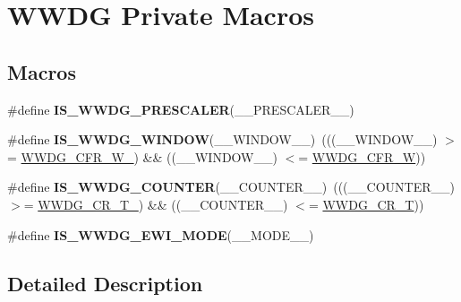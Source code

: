 \hypertarget{group___w_w_d_g___private___macros}{}\section{W\+W\+DG Private Macros}
\label{group___w_w_d_g___private___macros}
\subsection*{Macros}
\begin{DoxyCompactItemize}
\item 
\#define {\bfseries I\+S\+\_\+\+W\+W\+D\+G\+\_\+\+P\+R\+E\+S\+C\+A\+L\+ER}(\+\_\+\+\_\+\+P\+R\+E\+S\+C\+A\+L\+E\+R\+\_\+\+\_\+)
\item 
\mbox{\label{group___w_w_d_g___private___macros_ga2e7358bcfcc6df115466ebfd0ff55644}} 
\#define {\bfseries I\+S\+\_\+\+W\+W\+D\+G\+\_\+\+W\+I\+N\+D\+OW}(\+\_\+\+\_\+\+W\+I\+N\+D\+O\+W\+\_\+\+\_\+)~(((\+\_\+\+\_\+\+W\+I\+N\+D\+O\+W\+\_\+\+\_\+) $>$= \hyperlink{group___peripheral___registers___bits___definition_ga9fc25f8d5c23a76d364c1cb5d7518a17}{W\+W\+D\+G\+\_\+\+C\+F\+R\+\_\+\+W\+\_}) \&\& ((\+\_\+\+\_\+\+W\+I\+N\+D\+O\+W\+\_\+\+\_\+) $<$= \hyperlink{group___peripheral___registers___bits___definition_gabfbb9991bd6a3699399ca569c71fe8c9}{W\+W\+D\+G\+\_\+\+C\+F\+R\+\_\+W}))
\item 
\mbox{\label{group___w_w_d_g___private___macros_ga01304524b12741cc7c4fa1905f1945bd}} 
\#define {\bfseries I\+S\+\_\+\+W\+W\+D\+G\+\_\+\+C\+O\+U\+N\+T\+ER}(\+\_\+\+\_\+\+C\+O\+U\+N\+T\+E\+R\+\_\+\+\_\+)~(((\+\_\+\+\_\+\+C\+O\+U\+N\+T\+E\+R\+\_\+\+\_\+) $>$= \hyperlink{group___peripheral___registers___bits___definition_ga8abc0d44e390aabc2c7f787f2ed0b632}{W\+W\+D\+G\+\_\+\+C\+R\+\_\+\+T\+\_}) \&\& ((\+\_\+\+\_\+\+C\+O\+U\+N\+T\+E\+R\+\_\+\+\_\+) $<$= \hyperlink{group___peripheral___registers___bits___definition_ga400774feb33ed7544d57d6a0a76e0f70}{W\+W\+D\+G\+\_\+\+C\+R\+\_\+T}))
\item 
\#define {\bfseries I\+S\+\_\+\+W\+W\+D\+G\+\_\+\+E\+W\+I\+\_\+\+M\+O\+DE}(\+\_\+\+\_\+\+M\+O\+D\+E\+\_\+\+\_\+)
\end{DoxyCompactItemize}


\subsection{Detailed Description}


